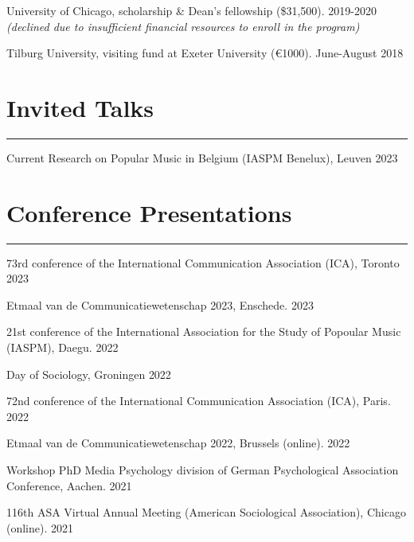 \documentclass[12pt,]{article}
\begin{document}
University of Chicago, scholarship \& Dean's fellowship (\$31,500).
\hfill \begingroup\small 2019-2020 \endgroup\\
\emph{(declined due to insufficient financial resources to enroll in the
program)}

Tilburg University, visiting fund at Exeter University (€1000).
\hfill \begingroup\small June-August 2018\endgroup

\hypertarget{invited-talks}{%
\section{Invited Talks}\label{invited-talks}}

\vspace{-10pt}
\rule{1\linewidth}{\linethickness}

Current Research on Popular Music in Belgium (IASPM Benelux), Leuven
\hfill \begingroup\small 2023\endgroup

\hypertarget{conference-presentations}{%
\section{Conference Presentations}\label{conference-presentations}}

\vspace{-10pt}
\rule{1\linewidth}{\linethickness}

73rd conference of the International Communication Association (ICA),
Toronto \hfill \begingroup\small 2023\endgroup

Etmaal van de Communicatiewetenschap 2023, Enschede.
\hfill \begingroup\small 2023\endgroup

21st conference of the International Association for the Study of
Popoular Music (IASPM), Daegu. \hfill \begingroup\small 2022\endgroup

Day of Sociology, Groningen \hfill \begingroup\small 2022\endgroup

72nd conference of the International Communication Association (ICA),
Paris. \hfill \begingroup\small 2022\endgroup

Etmaal van de Communicatiewetenschap 2022, Brussels (online).
\hfill \begingroup\small 2022\endgroup

Workshop PhD Media Psychology division of German Psychological
Association Conference, Aachen. \hfill \begingroup\small 2021\endgroup

116th ASA Virtual Annual Meeting (American Sociological Association),
Chicago (online). \hfill \begingroup\small 2021\endgroup
\end{document}
